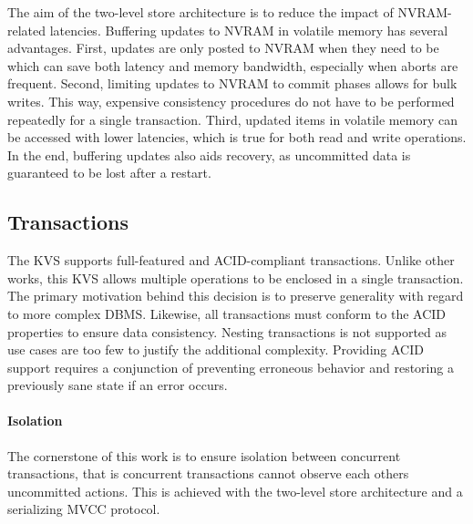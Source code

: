 The aim of the two-level store architecture is to reduce the impact of
\ac{NVRAM}-related latencies. Buffering updates to \ac{NVRAM} in volatile memory
has several advantages. First, updates are only posted to \ac{NVRAM} when they
need to be which can save both latency and memory bandwidth, especially when
aborts are frequent. Second, limiting updates to \ac{NVRAM} to commit phases
allows for bulk writes. This way, expensive consistency procedures do not have
to be performed repeatedly for a single transaction. Third, updated items in
volatile memory can be accessed with lower latencies, which is true for both
read and write operations. In the end, buffering updates also aids recovery, as
uncommitted data is guaranteed to be lost after a restart.



\subsection{Transactions}
\label{ch:concept-kvs-tx}

The \ac{KVS} supports full-featured and ACID-compliant transactions. Unlike
other works, this \ac{KVS} allows multiple operations to be enclosed in a single
transaction. The primary motivation behind this decision is to preserve
generality with regard to more complex \ac{DBMS}. Likewise, all transactions
must conform to the ACID properties to ensure data consistency. Nesting
transactions is not supported as use cases are too few to justify the additional
complexity. Providing ACID support requires a conjunction of preventing
erroneous behavior and restoring a previously sane state if an error occurs.

\paragraph{Isolation}

The cornerstone of this work is to ensure isolation between concurrent
transactions, that is concurrent transactions cannot observe each others
uncommitted actions. This is achieved with the two-level store architecture and
a serializing \ac{MVCC} protocol.

